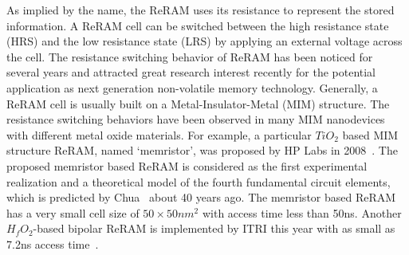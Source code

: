 As implied by the name, the ReRAM uses its resistance to represent the stored information. A ReRAM cell can be switched between the high resistance state (HRS) and the low resistance state (LRS) by applying an external voltage across the cell. The resistance switching behavior of ReRAM has been noticed for several years and attracted great research interest recently for the potential application as next generation non-volatile memory technology. Generally, a ReRAM cell is usually built on a Metal-Insulator-Metal (MIM) structure. The resistance switching behaviors have been observed in many MIM nanodevices with different metal oxide materials. For example, a particular $TiO_2$ based MIM structure ReRAM, named `memristor', was proposed by HP Labs in 2008~\cite{memristor:missing}. The proposed memristor based ReRAM is considered as the first experimental realization and a theoretical model of the fourth fundamental circuit elements, which is predicted by Chua~\cite{memristor:chua} about 40 years ago. The memristor based ReRAM has a very small cell size of $50\times50 nm^2$ with access time less than 50ns. Another $H_fO_2$-based bipolar ReRAM is implemented by ITRI this year with as small as 7.2ns access time~\cite{ReRAM_ISSCC2011_Sheu}.


